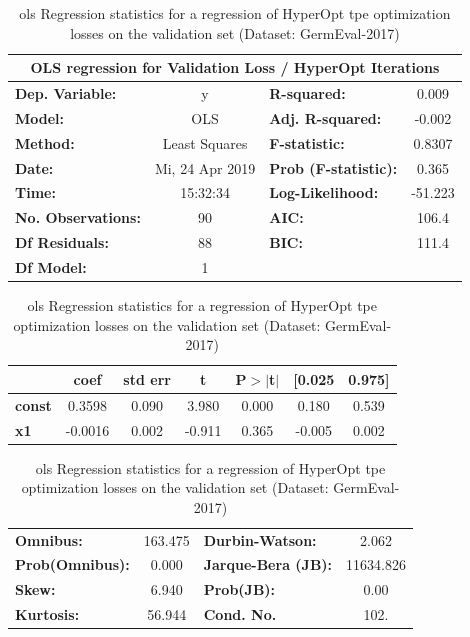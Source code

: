 \begin{table}
	\begin{center}
		\begin{tabular}{lclc}
		\toprule
		\multicolumn{4}{c}{OLS regression for Validation Loss / HyperOpt Iterations} \\
		\midrule
		\textbf{Dep. Variable:}    &        y        & \textbf{  R-squared:         } &     0.009   \\
		\textbf{Model:}            &       OLS       & \textbf{  Adj. R-squared:    } &    -0.002   \\
		\textbf{Method:}           &  Least Squares  & \textbf{  F-statistic:       } &    0.8307   \\
		\textbf{Date:}             & Mi, 24 Apr 2019 & \textbf{  Prob (F-statistic):} &    0.365    \\
		\textbf{Time:}             &     15:32:34    & \textbf{  Log-Likelihood:    } &   -51.223   \\
		\textbf{No. Observations:} &          90     & \textbf{  AIC:               } &     106.4   \\
		\textbf{Df Residuals:}     &          88     & \textbf{  BIC:               } &     111.4   \\
		\textbf{Df Model:}         &           1     & \textbf{                     } &             \\
		\bottomrule
		\end{tabular}
		\begin{tabular}{lcccccc}
					   & \textbf{coef} & \textbf{std err} & \textbf{t} & \textbf{P$>$$|$t$|$} & \textbf{[0.025} & \textbf{0.975]}  \\
		\midrule
		\textbf{const} &       0.3598  &        0.090     &     3.980  &         0.000        &        0.180    &        0.539     \\
		\textbf{x1}    &      -0.0016  &        0.002     &    -0.911  &         0.365        &       -0.005    &        0.002     \\
		\bottomrule
		\end{tabular}
		\begin{tabular}{lclc}
		\textbf{Omnibus:}       & 163.475 & \textbf{  Durbin-Watson:     } &     2.062  \\
		\textbf{Prob(Omnibus):} &   0.000 & \textbf{  Jarque-Bera (JB):  } & 11634.826  \\
		\textbf{Skew:}          &   6.940 & \textbf{  Prob(JB):          } &      0.00  \\
		\textbf{Kurtosis:}      &  56.944 & \textbf{  Cond. No.          } &      102.  \\
		\bottomrule
		\end{tabular}
	\end{center}
	\caption{\gls{ols} Regression statistics for a regression of HyperOpt \gls{tpe} optimization losses on the validation set {(Dataset: GermEval-2017)}}
	\label{tab:08_olsLossItVal}	
\end{table}

